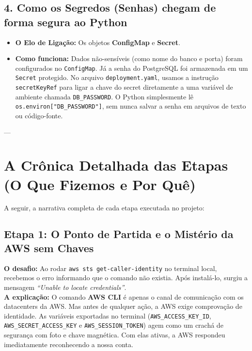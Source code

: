 \documentclass[11pt,a4paper]{article}
\begin{document}
\subsection{4. Como os Segredos (Senhas) chegam de forma segura ao Python}
\begin{itemize}[leftmargin=*]
    \item \textbf{O Elo de Ligação:} Os objetos \textbf{ConfigMap} e \textbf{Secret}.
    \item \textbf{Como funciona:} Dados não-sensíveis (como nome do banco e porta) foram configurados no \texttt{ConfigMap}. Já a senha do PostgreSQL foi armazenada em um \texttt{Secret} protegido. No arquivo \texttt{deployment.yaml}, usamos a instrução \texttt{secretKeyRef} para ligar a chave do secret diretamente a uma variável de ambiente chamada \texttt{DB\_PASSWORD}. O Python simplesmente lê \texttt{os.environ["DB\_PASSWORD"]}, sem nunca salvar a senha em arquivos de texto ou código-fonte.
\end{itemize}

---

\section{A Crônica Detalhada das Etapas (O Que Fizemos e Por Quê)}

A seguir, a narrativa completa de cada etapa executada no projeto:

\subsection{Etapa 1: O Ponto de Partida e o Mistério da AWS sem Chaves}
\textbf{O desafio:} Ao rodar \texttt{aws sts get-caller-identity} no terminal local, recebemos o erro informando que o comando não existia. Após instalá-lo, surgiu a mensagem \textit{``Unable to locate credentials''}.\\
\textbf{A explicação:} O comando \textbf{AWS CLI} é apenas o canal de comunicação com os datacenters da AWS. Mas antes de qualquer ação, a AWS exige comprovação de identidade. As variáveis exportadas no terminal (\texttt{AWS\_ACCESS\_KEY\_ID}, \texttt{AWS\_SECRET\_ACCESS\_KEY} e \texttt{AWS\_SESSION\_TOKEN}) agem como um crachá de segurança com foto e chave magnética. Com elas ativas, a AWS respondeu imediatamente reconhecendo a nossa conta.
\end{document}
